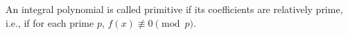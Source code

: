 An integral polynomial is called primitive if its coefficients are relatively prime, i.e., if for each prime $p$, $f(x) \not\equiv 0 \pmod{p}$.
